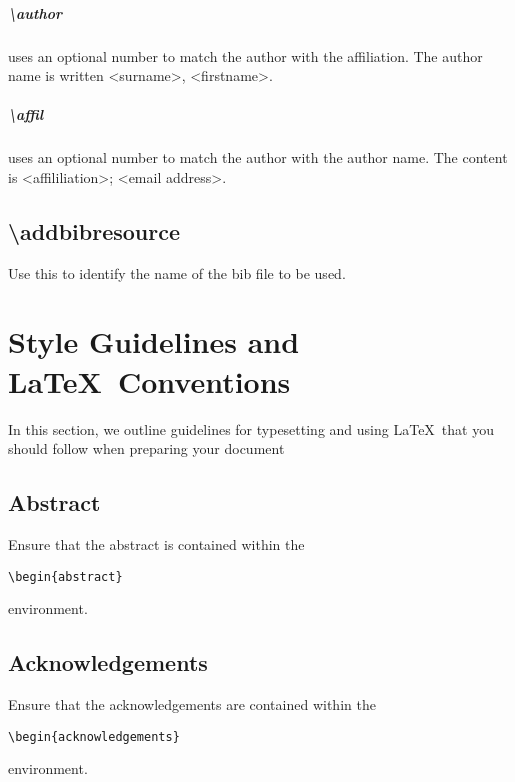 \documentclass[examplefnt,biber]{nowfnt} %
\begin{document}
\paragraph{\textbackslash author} uses an optional number to match the
author with the affiliation. The author name is written <surname>, <firstname>.
\paragraph{\textbackslash affil} uses an optional number to match the
author with the author name. The content is <affililiation>; <email address>.

\section{\textbackslash addbibresource}
Use this to identify the name of the bib file to be used. 



\chapter{Style Guidelines and \LaTeX\ Conventions}

In this section, we outline guidelines for typesetting and using \LaTeX\ that you should follow when preparing
your document

\section{Abstract}
Ensure that the abstract is contained within the
\begin{verbatim}
\begin{abstract}
\end{verbatim} environment.

\section{Acknowledgements}
Ensure that the acknowledgements are contained within the 
\begin{verbatim}
\begin{acknowledgements}
\end{verbatim} environment.
\end{document}
